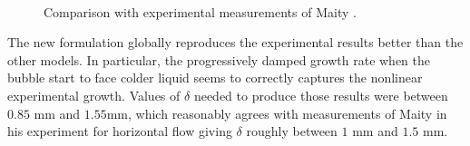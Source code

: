 \begin{figure}[h!]
\\
\caption{Comparison with experimental measurements of Maity  \cite{maity_effect_2000}.}
\label{fig:growth_comp_maity}
\end{figure}

\npar

The new formulation globally reproduces the experimental results better than the other models. In particular, the progressively damped growth rate when the bubble start to face colder liquid seems to correctly captures the nonlinear experimental growth. Values of $\delta$ needed to produce those results were between $0.85$ mm and $1.55$mm, which reasonably agrees with measurements of Maity in his experiment for horizontal flow giving $\delta$ roughly between $1$ mm and $1.5$ mm.

